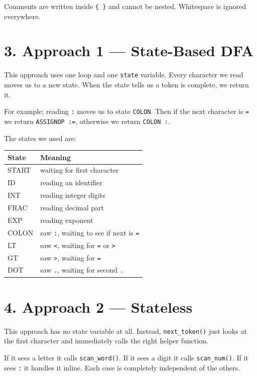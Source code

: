 \documentclass[12pt, a4paper]{article}
\begin{document}
Comments are written inside \texttt{\{ \}} and cannot be nested.
Whitespace is ignored everywhere.

\section*{3. Approach 1 — State-Based DFA}

This approach uses one loop and one \texttt{state} variable.
Every character we read moves us to a new state. When the state
tells us a token is complete, we return it.

For example: reading \texttt{:} moves us to state \texttt{COLON}.
Then if the next character is \texttt{=} we return \texttt{ASSIGNOP :=},
otherwise we return \texttt{COLON :}.

The states we used are:

\begin{center}
\begin{tabular}{ll}
\toprule
State & Meaning \\
\midrule
START     & waiting for first character \\
ID        & reading an identifier \\
INT       & reading integer digits \\
FRAC      & reading decimal part \\
EXP       & reading exponent \\
COLON     & saw \texttt{:}, waiting to see if next is \texttt{=} \\
LT        & saw \texttt{<}, waiting for \texttt{=} or \texttt{>} \\
GT        & saw \texttt{>}, waiting for \texttt{=} \\
DOT       & saw \texttt{.}, waiting for second \texttt{.} \\
\bottomrule
\end{tabular}
\end{center}

\section*{4. Approach 2 — Stateless}

This approach has no state variable at all. Instead,
\texttt{next\_token()} just looks at the first character and
immediately calls the right helper function.

If it sees a letter it calls \texttt{scan\_word()}.
If it sees a digit it calls \texttt{scan\_num()}.
If it sees \texttt{:} it handles it inline.
Each case is completely independent of the others.
\end{document}
